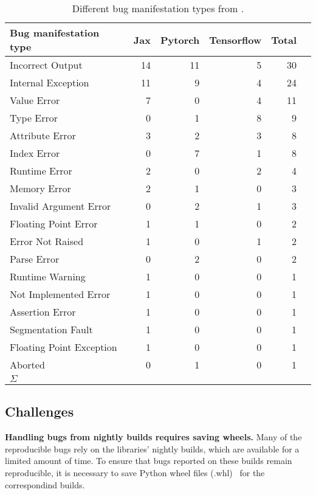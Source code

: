 \documentclass[sigconf,screen]{acmart}
\begin{document}

\begin{table}
  \centering
  \caption{\label{table:bug-stats}Different bug manifestation types
    from \tname.}
  \begin{tabular}{lrrrrr}\toprule
    Bug manifestation type &Jax &Pytorch &Tensorflow &Total \\\midrule
    Incorrect Output &14 &11 &5 &30 \\
    Internal Exception &11 &9 &4 &24 \\
    Value Error &7 &0 &4 &11 \\
    Type Error &0 &1 &8 &9 \\
    Attribute Error &3 &2 &3 &8 \\
    Index Error &0 &7 &1 &8 \\
    Runtime Error &2 &0 &2 &4 \\
    Memory Error &2 &1 &0 &3 \\
    Invalid Argument Error &0 &2 &1 &3 \\
    Floating Point Error &1 &1 &0 &2 \\
    Error Not Raised &1 &0 &1 &2 \\
    Parse Error &0 &2 &0 &2 \\
    Runtime Warning &1 &0 &0 &1 \\
    Not Implemented Error &1 &0 &0 &1 \\
    Assertion Error &1 &0 &0 &1 \\
    Segmentation Fault &1 &0 &0 &1 \\
    Floating Point Exception &1 &0 &0 &1 \\
    Aborted &0 &1 &0 &1 \\
    \midrule
    $\Sigma$ &\numjaxbugs{} &\numtorchbugs{} &\numtfbugs{} &\numbugs{} \\
    \bottomrule
  \end{tabular}
\end{table}

\subsection{Challenges}
\label{sec:challenges}

\textbf{Handling bugs from nightly builds requires saving wheels.}
Many of the reproducible bugs rely on the libraries' nightly builds,
which are available for a limited amount of time. To ensure that bugs
reported on these builds remain reproducible, it is necessary to save
Python wheel files (.whl)~\cite{wheels} for the correspondind builds.
\end{document}
